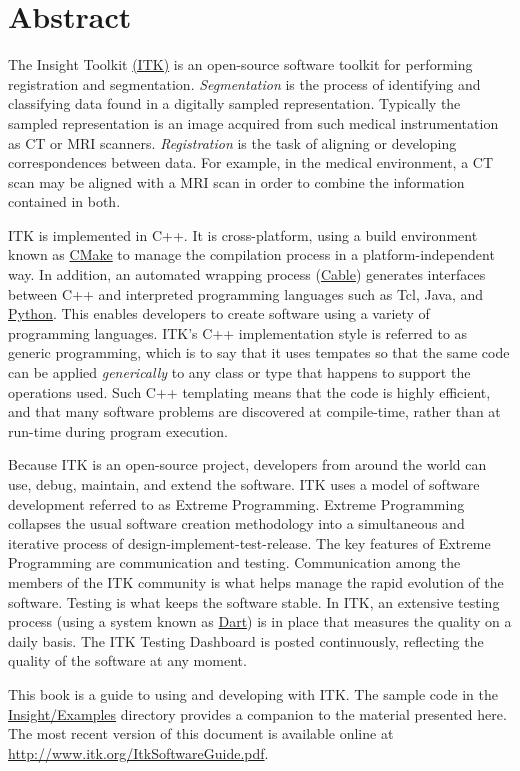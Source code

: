 \chapter*{Abstract}
\noindent
The Insight Toolkit \href{http://www.itk.org}{(ITK)} is an open-source
software toolkit for performing registration and
segmentation. \emph{Segmentation} is the process of identifying and
classifying data found in a digitally sampled
representation. Typically the sampled representation is an image
acquired from such medical instrumentation as CT or MRI
scanners. \emph{Registration} is the task of aligning or developing
correspondences between data. For example, in the medical environment,
a CT scan may be aligned with a MRI scan in order to combine the
information contained in both.

ITK is implemented in C++. It is cross-platform, using a build
environment known as \href{http://www.cmake.org}{CMake} to manage the
compilation process in a platform-independent way. In addition, an
automated wrapping process
(\href{http://public.kitware.com/Cable/HTML/Index.html}{Cable})
generates interfaces between C++ and interpreted programming languages
such as Tcl, Java, and \href{http://www.python.org}{Python}. This
enables developers to create software using a variety of programming
languages. ITK's C++ implementation style is referred to as generic
programming, which is to say that it uses tempates so that the same
code can be applied \emph{generically} to any class or type that
happens to support the operations used. Such C++
templating means that the code is highly efficient, and that many
software problems are discovered at compile-time, rather than at
run-time during program execution.

Because ITK is an open-source project, developers from around the
world can use, debug, maintain, and extend the software. ITK uses a
model of software development referred to as Extreme
Programming. Extreme Programming collapses the usual software creation
methodology into a simultaneous and iterative process of
design-implement-test-release. The key features of Extreme Programming
are communication and testing. Communication among the members of the
ITK community is what helps manage the rapid evolution of the
software.  Testing is what keeps the software stable. In ITK, an
extensive testing process (using a system known as
\href{http://public.kitware.com/dashboard.php}{Dart}) is in place that
measures the quality on a daily basis. The ITK Testing Dashboard is
posted continuously, reflecting the quality of the software at any
moment.

This book is a guide to using and developing with ITK. The sample code
in the
\href{http://www.itk.org/cgi-bin/cvsweb.cgi/Insight/Examples/?cvsroot=Insight}{Insight/Examples}
directory provides a companion to the material presented here.  The
most recent version of this document is available online at
\url{http://www.itk.org/ItkSoftwareGuide.pdf}.



